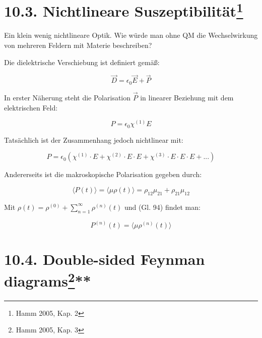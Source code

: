 \section{10.3. Nichtlineare  Suszeptibilität\protect\footnote{Hamm 2005, Kap. 2}\hfill *} 

Ein klein wenig nichtlineare Optik. Wie würde man ohne QM
die Wechselwirkung von mehreren Feldern mit Materie
beschreiben?

Die dielektrische Verschiebung ist definiert gemäß:

\begin{equation}
    \vec{D} = \epsilon_0\vec{E} + \vec{P}
\end{equation}

In erster Näherung steht die Polarisation $\vec{P}$ in linearer Beziehung mit dem elektrischen Feld:

\begin{equation}
    P = \epsilon_0\chi^{(1)}E
\end{equation}

Tatsächlich ist der Zusammenhang jedoch nichtlinear mit:

\begin{equation}
    P = \epsilon_0(\chi^{(1)}\cdot E + \chi^{(2)}\cdot E\cdot E + \chi^{(3)}\cdot E\cdot E\cdot E + ...)
\end{equation}

Andererseits ist die makroskopische Polarisation gegeben durch:

\begin{equation}
    \langle P(t)\rangle = \langle \mu\rho(t)\rangle = \rho_{12}\mu_{21} + \rho_{21}\mu_{12}
\end{equation}

Mit $\rho(t) = \rho^{(0)} + \sum_{n=1}^{\infty}\rho^{(n)}(t)$ und (Gl. 94) findet man:

\begin{equation}
    P^{(n)}(t) = \langle \mu\rho^{(n)}(t)\rangle
\end{equation}

\section{10.4. Double-sided Feynman diagrams\protect\footnote{Hamm 2005, Kap. 3}\hfill ***} 

